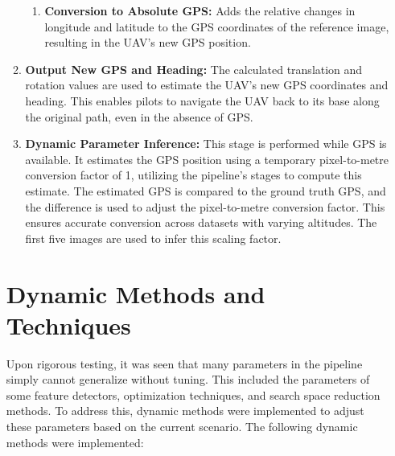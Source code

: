 \begin{enumerate}
\begin{enumerate}
\begin{enumerate}
        \item \textbf{Conversion to Absolute GPS:}  
        Adds the relative changes in longitude and latitude to the GPS coordinates of the reference image, resulting in the UAV's new GPS position.
    \end{enumerate}

    \item \textbf{Output New GPS and Heading:}  
    The calculated translation and rotation values are used to estimate the UAV's new GPS coordinates and heading. This enables pilots to navigate the UAV back to its base along the original path, even in the absence of GPS.

    \item \textbf{Dynamic Parameter Inference:}  
    This stage is performed while GPS is available. It estimates the GPS position using a temporary pixel-to-metre conversion factor of 1, utilizing the pipeline's stages to compute this estimate. The estimated GPS is compared to the ground truth GPS, and the difference is used to adjust the pixel-to-metre conversion factor. This ensures accurate conversion across datasets with varying altitudes. The first five images are used to infer this scaling factor.


\end{enumerate}


\section*{Dynamic Methods and Techniques}
Upon rigorous testing, it was seen that many parameters in the pipeline simply cannot generalize without tuning. This included the parameters of some feature detectors, optimization techniques, and search space reduction methods. To address this, dynamic methods were implemented to adjust these parameters based on the current scenario. The following dynamic methods were implemented:


\end{enumerate}
